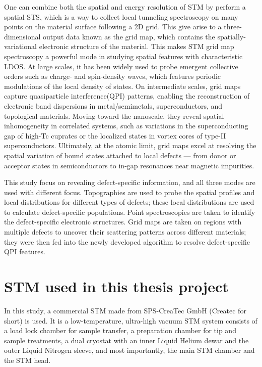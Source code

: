 One can combine both the spatial and energy resolution of \ac{STM} by perform a spatial \ac{STS}, which is a way to collect local tunneling spectroscopy on many points on the material surface following a 2D grid. This give arise to a three-dimensional output data known as the grid map, which contains the spatially-variational electronic structure of the material. This makes \ac{STM} grid map spectroscopy a powerful mode in studying spatial features with characteristic \ac{LDOS}. At large scales, it has been widely used to probe emergent collective orders such as charge- and spin-density waves, which features periodic modulations of the local density of states. On intermediate scales, grid maps capture quasiparticle interference(QPI) patterns, enabling the reconstruction of electronic band dispersions in metal/semimetals, superconductors, and topological materials\cite{avrahamQuasiparticleInterferenceStudies2018}. Moving toward the nanoscale, they reveal spatial inhomogeneity in correlated systems, such as variations in the superconducting gap of high-Tc cuprates\cite{duanSingleparticleTunnelingSpectroscopy2021}\cite{boyerImagingTwoGaps2007} or the localized states in vortex cores of type-II superconductors\cite{panSTMStudiesElectronic2000}\cite{suderowImagingSuperconductingVortex2014}. Ultimately, at the atomic limit, grid maps excel at resolving the spatial variation of bound states attached to local defects — from donor or acceptor states in semiconductors\cite{mahieuDirectEvidenceShallow2005} to in-gap resonances near magnetic impurities\cite{schneiderMagnetismIngapStates2019}\cite{yangIngapQuasiparticleExcitations2013}\cite{chatzopoulosSpatiallyDispersingYuShibaRusinov2021}.

This study focus on revealing defect-specific information, and all three modes are used with different focus. Topographies are used to probe the spatial profiles and local distributions for different types of defects; these local distributions are used to calculate defect-specific populations. Point spectroscopies are taken to identify the defect-specific electronic structures. Grid maps are taken on regions with multiple defects to uncover their scattering patterns across different materials; they were then fed into the newly developed algorithm to resolve defect-specific \ac{QPI} features. 

\section{STM used in this thesis project}
In this study, a commercial STM made from SPS-CreaTec GmbH (Createc for short) is used. It is a low-temperature, ultra-high vacuum STM system consists of a load lock chamber for sample transfer, a preparation chamber for tip and sample treatments, a dual cryostat with an inner Liquid Helium dewar and the outer Liquid Nitrogen sleeve, and most importantly, the main STM chamber and the STM head. 

